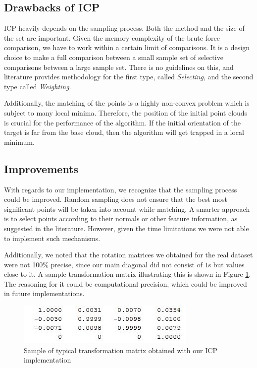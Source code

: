 \documentclass[11pt]{article}
\begin{document}
\subsection{Drawbacks of ICP}
ICP heavily depends on the sampling process. Both the method and the size of the set are important. Given the memory complexity of the brute force comparison, we have to work within a certain limit of comparisons. It is a design choice to make a full comparison between a small sample set of selective comparisons between a large sample set. There is no guidelines on this, and literature provides methodology for the first type, called \textit{Selecting}, and the second type called \textit{Weighting}.

Additionally, the matching of the points is a highly non-convex problem which is subject to many local minima. Therefore, the position of the initial point clouds is crucial for the performance of the algorithm. If the initial orientation of the target is far from the base cloud, then the algorithm will get trapped in a local minimum.
 
 
\subsection{Improvements}
With regards to our implementation, we recognize that the sampling process could be improved. Random sampling does not ensure that the best most significant points will be taken into account while matching. A smarter approach is to select points according to their normals or other feature information, as suggested in the literature. However, given the time limitations we were not able to implement such mechanisms.

Additionally, we noted that the rotation matrices we obtained for the real dataset were not 100\% precise, since our main diagonal did not consist of $1$s but values close to it. A sample transformation matrix illustrating this is shown in Figure \ref{fig:matrix}. The reasoning for it could be computational precision, which could be improved in future implementations.

\begin{figure}[H]
	\centering
	\includegraphics[width=.5\textwidth]{img/transformation_matrix.jpg}
	\caption{Sample of typical transformation matrix obtained with our ICP implementation}
	\label{fig:matrix}
\end{figure}
\end{document}

